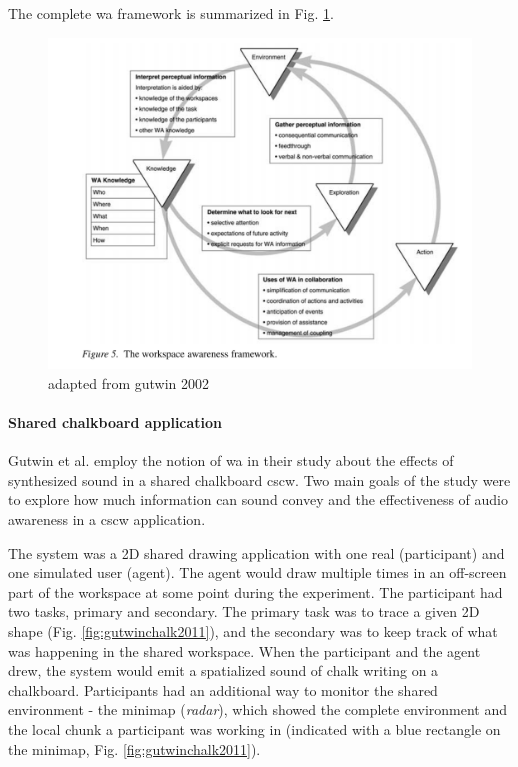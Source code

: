 The complete \gls{wa} framework is summarized in Fig. \ref{fig:waframework}.

\begin{figure}
	\centering
	\includegraphics[width=0.7\linewidth]{figures/placeholders/WA_framework}
	\caption{adapted from gutwin 2002}
	\label{fig:waframework}
\end{figure}


\paragraph{Shared chalkboard application} 
\label{par:shared_chalkboard_application}
Gutwin et al. \parencite{gutwin_chalk_2011} employ the notion of \gls{wa} in their study about the effects of synthesized sound in a shared chalkboard \gls{cscw}.
Two main goals of the study were to explore how much information can sound convey and the effectiveness of audio awareness in a \gls{cscw} application.

The system was a 2D shared drawing application with one real (participant) and one simulated user (agent). The agent would draw multiple times in an off-screen part of the workspace at some point during the experiment. The participant had two tasks, primary and secondary. The primary task was to trace a given 2D shape (Fig. \ref{fig:gutwinchalk2011}), and the secondary was to keep track of what was happening in the shared workspace. When the participant and the agent drew, the system would emit a spatialized sound of chalk writing on a chalkboard. Participants had an additional way to monitor the shared environment -
the minimap (\textit{radar}), which showed the complete environment and the local chunk a participant was working in (indicated with a blue rectangle on the minimap, Fig. \ref{fig:gutwinchalk2011}).

